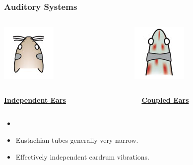 \documentclass{beamer}
\begin{document}
\begin{frame}[t]
\frametitle{Auditory Systems}

 \begin{columns}
 
     \begin{column}{0.5\textwidth}
    \centering
    \includegraphics[width = 1.5 cm]{Diagrams/Presentation/indepears.png}\\
    \end{column}
     
    \begin{column}{0.5\textwidth}
    \centering
    \includegraphics[width = 1.5 cm]{Diagrams/Presentation/coupledears.png}\\
    \end{column}
    
  \end{columns}
  
 \begin{columns}
     \begin{column}{0.5\textwidth}
    \centering
    \underline{\textbf{Independent Ears}}
    \end{column}
     
    \begin{column}{0.5\textwidth}
    \centering
    \underline{\textbf{Coupled Ears}}
    \end{column}
  \end{columns}

  \begin{columns}
    \begin{column}{0.5\textwidth}
    \centering
    \small
     \begin{itemize}
     \item[]
    \item[] Eustachian tubes generally very narrow.
     \item[] Effectively independent eardrum vibrations.
     \end{itemize}
    \end{column}
     

\end{columns}
\end{frame}
\end{document}
